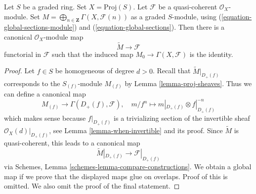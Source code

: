\begin{lemma}
\label{lemma-comparison-proj-quasi-coherent}
Let $S$ be a graded ring. Set $X = \text{Proj}(S)$.
Let $\mathcal{F}$ be a quasi-coherent $\mathcal{O}_X$-module.
Set $M = \bigoplus_{n \in \mathbf{Z}} \Gamma(X, \mathcal{F}(n))$ as
a graded $S$-module, using
(\ref{equation-global-sections-module}) and (\ref{equation-global-sections}).
Then there is a canonical $\mathcal{O}_X$-module map
$$
\widetilde{M} \longrightarrow \mathcal{F}
$$
functorial in $\mathcal{F}$ such that the induced map
$M_0 \to \Gamma(X, \mathcal{F})$ is the identity.
\end{lemma}

\begin{proof}
Let $f \in S$ be homogeneous of degree $d > 0$. Recall that
$\widetilde{M}|_{D_{+}(f)}$ corresponds to the
$S_{(f)}$-module $M_{(f)}$ by Lemma \ref{lemma-proj-sheaves}.
Thus we can define a canonical map
$$
M_{(f)} \longrightarrow \Gamma(D_+(f), \mathcal{F}),\quad
m/f^n \longmapsto m|_{D_+(f)} \otimes f|_{D_+(f)}^{-n}
$$
which makes sense because $f|_{D_+(f)}$ is a trivializing
section of the invertible sheaf $\mathcal{O}_X(d)|_{D_+(f)}$, see
Lemma \ref{lemma-when-invertible} and its proof.
Since $\widetilde{M}$ is quasi-coherent, this leads to a canonical
map
$$
\widetilde{M}|_{D_+(f)} \longrightarrow \mathcal{F}|_{D_+(f)}
$$
via Schemes, Lemma \ref{schemes-lemma-compare-constructions}.
We obtain a global map if we prove that the displayed maps glue on overlaps.
Proof of this is omitted. We also omit the proof of the final statement.
\end{proof}










